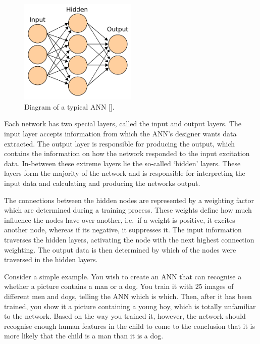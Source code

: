 \begin{figure}
  \centering
  \includegraphics[width=0.5\textwidth]{figures/chapter2/ANN_diagram}
  \caption[Diagram of a typical ANN.]{Diagram of a typical ANN [\cite{ann-wiki-pic}].}
\label{fig:chap2-ann-layout}
\end{figure}

Each network has two special layers, called the input and output layers. The input layer accepts information from which the ANN's designer wants data extracted. The output layer is responsible for producing the output, which contains the information on how the network responded to the input excitation data. In-between these extreme layers lie the so-called `hidden' layers. These layers form the majority of the network and is responsible for interpreting the input data and calculating and producing the networks output.

The connections between the hidden nodes are represented by a weighting factor which are determined during a training process. These weights define how much influence the nodes have over another, i.e.\ if a weight is positive, it excites another node, whereas if its negative, it suppresses it. The input information traverses the hidden layers, activating the node with the next highest connection weighting. The output data is then determined by which of the nodes were traversed in the hidden layers.

Consider a simple example. You wish to create an ANN that can recognise a whether a picture contains a man or a dog. You train it with 25 images of different men and dogs, telling the ANN which is which. Then, after it has been trained, you show it a picture containing a young boy, which is totally unfamiliar to the network. Based on the way you trained it, however, the network should recognise enough human features in the child to come to the conclusion that it is more likely that the child is a man than it is a dog. 

